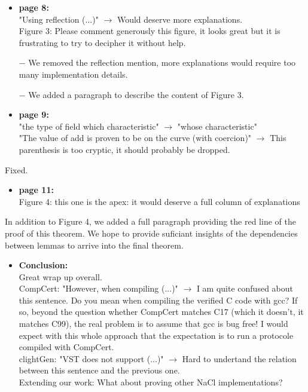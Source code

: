 \begin{itemize}
  \item \textbf{page 8:}\\
        "Using reflection (...)" $\rightarrow$ Would deserve more explanations.\\
        Figure 3: Please comment generously this figure, it looks great but it is frustrating to try to decipher it without help.
\end{itemize}
\begin{answer}
  \begin{itemize}
    \item[$-$] We removed the reflection mention, more explanations would require too many implementation details.
    \item[$-$] We added a paragraph to describe the content of Figure 3.
  \end{itemize}
\end{answer}

\begin{itemize}
  \item \textbf{page 9:}\\
        "the type of field which characteristic" $\rightarrow$ "whose characteristic"\\
        "The value of add is proven to be on the curve (with coercion)" $\rightarrow$ This parenthesis is too cryptic, it should probably be dropped.
\end{itemize}
\begin{answer}
  Fixed.
\end{answer}

\begin{itemize}
  \item \textbf{page 11:}\\
        Figure 4: this one is the apex: it would deserve a full column of explanations
\end{itemize}
\begin{answer}
  In addition to Figure 4, we added a full paragraph providing the red line of the proof of this theorem.
  We hope to provide suficiant insights of the dependencies between lemmas to arrive into the final theorem.
\end{answer}

\begin{itemize}
  \item \textbf{Conclusion:}\\
        Great wrap up overall.\\
        CompCert: "However, when compiling (...)" $\rightarrow$ I am quite confused about this sentence. Do you mean when compiling the verified C code with gcc? If so, beyond the question whether CompCert matches C17 (which it doesn't, it matches C99), the real problem is to assume that gcc is bug free! I would expect with this whole approach that the expectation is to run a protocole compiled with CompCert.\\
        clightGen: "VST does not support (...)" $\rightarrow$ Hard to undertand the relation between this sentence and the previous one.\\
        Extending our work: What about proving other NaCl implementations?
\end{itemize}

